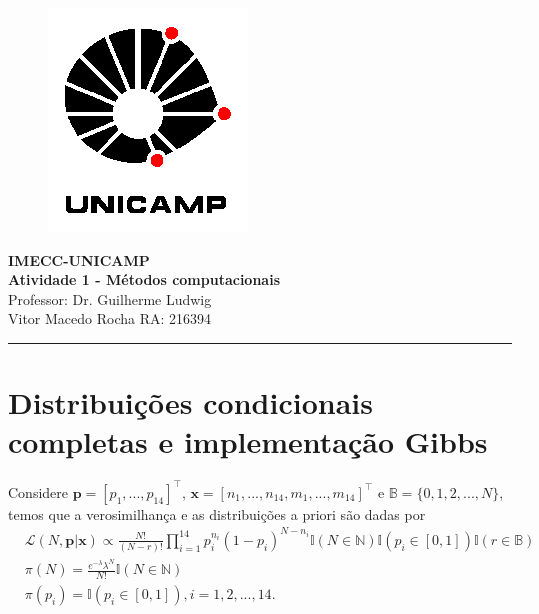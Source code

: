 \documentclass[a4paper,12pt,twoside]{article}
\begin{document}
\thispagestyle{empty}
	\begin{figure}[htb!]
		\begin{flushright}
			\includegraphics[scale=.3]{UNICAMP_logo.jpg} 
		\end{flushright}
	\end{figure}
	\vspace{-3.5cm}
	\hspace{1.5cm}
	\begin{flushleft}
	\begin{minipage}{15cm}
	\textbf{IMECC-UNICAMP\\
	Atividade 1 - Métodos computacionais}\\
	Professor: Dr. Guilherme Ludwig\\
	Vitor Macedo Rocha RA: 216394
	\end{minipage}
	\end{flushleft}
\noindent\rule{17cm}{0.4pt}

\section{Distribuições condicionais completas e implementação Gibbs}\label{gibbs}

Considere $\mathbf{p}=[p_{1},...,p_{14}]^{\top}$, $\mathbf{x}=[n_1,...,n_{14},m_1,...,m_{14}]^{\top}$ e $\mathbb{B}=\{0,1,2,...,N\}$, temos que a verosimilhança e as distribuições a priori são dadas por
\begin{align}
&\mathcal{L}(N,\mathbf{p}|\mathbf{x})\propto \frac{N!}{(N-r)!}\prod_{i=1}^{14}p_{i}^{n_i}(1-p_i)^{N-n_i}\mathds{I}(N \in \mathbb{N})\mathds{I}(p_i \in [0,1])\mathds{I}(r \in \mathbb{B})\\
&\pi(N)=\frac{e^{-\lambda}\lambda^{N}}{N!} \mathds{I}(N \in \mathbb{N})\\
&\pi(p_i)=\mathds{I}(p_i \in [0,1]) , i=1,2,...,14.
\end{align}
\end{document}
